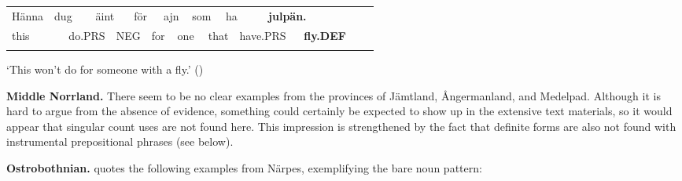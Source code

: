 \begin{tabular}{llllllllllllllllll}
\lsptoprule
Hänna & \multicolumn{2}{l}{dug

} & \multicolumn{2}{l}{äint

} & \multicolumn{2}{l}{för

} & \multicolumn{2}{l}{ajn

} & \multicolumn{2}{l}{som

} & \multicolumn{2}{l}{ha

} & \multicolumn{2}{l}{{\bfseries julpän.}

} & \multicolumn{2}{l}{} & \\
\multicolumn{2}{l}{this

} & \multicolumn{2}{l}{do.PRS

} & \multicolumn{2}{l}{NEG

} & \multicolumn{2}{l}{for

} & \multicolumn{2}{l}{one

} & \multicolumn{2}{l}{that

} & \multicolumn{2}{l}{have.PRS

} & \multicolumn{2}{l}{{\bfseries fly.DEF}

} & \multicolumn{2}{l}{}\\
\lspbottomrule
\end{tabular}

\begin{styleTranslation}
‘This won’t do for someone with a fly.’ (\citet[94]{Westerlund1978})

\end{styleTranslation}

\begin{styleBodytextC}
\textbf{Middle Norrland.} There seem to be no clear examples from the provinces of Jämtland, Ångermanland, and Medelpad. Although it is hard to argue from the absence of evidence, something could certainly be expected to show up in the extensive text materials, so it would appear that singular count uses are not found here. This impression is strengthened by the fact that definite forms are also not found with instrumental prepositional phrases (see below). 

\end{styleBodytextC}

\begin{styleBodytextC}
\textbf{Ostrobothnian.} \citet[207]{Nikula1997} quotes the following examples from Närpes, exemplifying the bare noun pattern:

\end{styleBodytextC}

